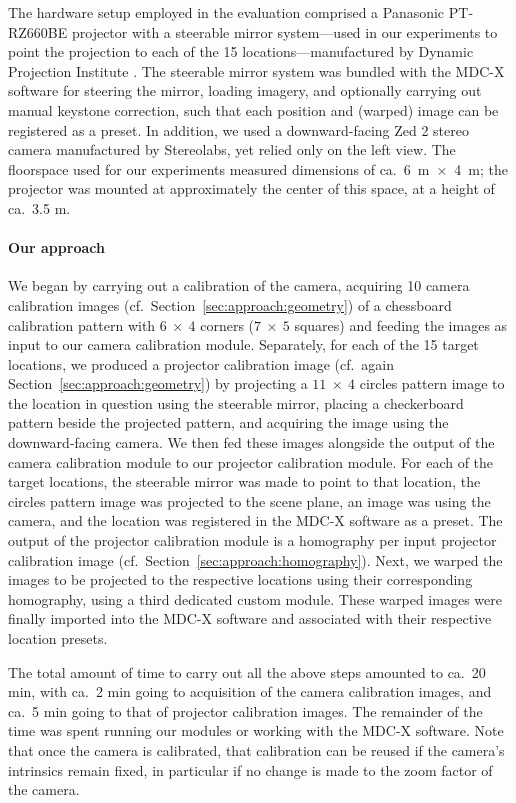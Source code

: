 \documentclass[review]{elsarticle}
\begin{document}
The hardware setup employed in the evaluation comprised a Panasonic PT-RZ660BE projector with a steerable mirror system---used in our experiments to point the projection to each of the 15 locations---manufactured by Dynamic Projection Institute \cite{rupprecht2020information,Rupprecht2021}. The steerable mirror system was bundled with the MDC-X software for steering the mirror, loading imagery, and optionally carrying out manual keystone correction, such that each position and (warped) image can be registered as a preset. In addition, we used a downward-facing Zed 2 stereo camera manufactured by Stereolabs, yet relied only on the left view. The floorspace used for our experiments measured dimensions of ca.\ 6~m~$\times$~4~m; the projector was mounted at approximately the center of this space, at a height of ca.\ 3.5 m.

\paragraph{Our approach} We began by carrying out a calibration of the camera, acquiring 10 camera calibration images (cf.\ Section~\ref{sec:approach:geometry}) of a chessboard calibration pattern with $6~\times~4$ corners ($7~\times~5$ squares) and feeding the images as input to our camera calibration module. Separately, for each of the 15 target locations, we produced a projector calibration image (cf.\ again Section~\ref{sec:approach:geometry}) by projecting a $11~\times~4$ circles pattern image to the location in question using the steerable mirror, placing a checkerboard pattern beside the projected pattern, and acquiring the image using the downward-facing camera. We then fed these images alongside the output of the camera calibration module to our projector calibration module. For each of the target locations, the steerable mirror was made to point to that location, the circles pattern image was projected to the scene plane, an image was using the camera, and the location was registered in the MDC-X software as a preset. The output of the projector calibration module is a homography per input projector calibration image (cf.\ Section~\ref{sec:approach:homography}). Next, we warped the images to be projected to the respective locations using their corresponding homography, using a third dedicated custom module. These warped images were finally imported into the MDC-X software and associated with their respective location presets.

The total amount of time to carry out all the above steps amounted to ca.\ 20 min, with ca.\ 2 min going to acquisition of the camera calibration images, and ca.\ 5 min going to that of projector calibration images. The remainder of the time was spent running our modules or working with the MDC-X software. Note that once the camera is calibrated, that calibration can be reused if the camera's intrinsics remain fixed, in particular if no change is made to the zoom factor of the camera.
\end{document}
